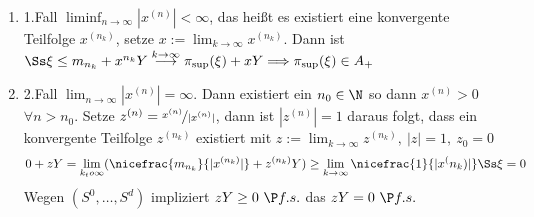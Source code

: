 \begin{bew}[Lemma 2.4]
\begin{enumerate}
 	 		\begin{enumerate}
 	 			\item 1.Fall $\operatorname{liminf}_{n\to\infty}|x^{(n)}|<\infty$, das heißt es existiert eine konvergente Teilfolge $x^{(n_k)}$, setze $x:=\lim_{k\to\infty}x^{(n_k)}$. Dann ist $\Ss\xi\le m_{n_k}+x^{n_k}Y\overset{k\to\infty}{\longrightarrow}\pi_{\sup}(\xi)+xY\Longrightarrow \pi_{\sup}(\xi)\in A_+$
 	 			\item 2.Fall $\lim_{n\to\infty}|x^{(n)}|=\infty$. Dann existiert ein $n_0\in\N$ so dann $x^{(n)}>0 $ $\forall n>n_0$. Setze $z^{(n)}=\nicefrac{x^{(n)}}{|x^{(n)}|}$, dann ist $|z^{(n)}|=1$ daraus folgt, dass ein konvergente Teilfolge $z^{(n_k)}$ existiert mit $z:=\lim_{k\to\infty}z^{(n_k)},\ |z|=1,\ z_0=0$
 	 			\begin{align*}
 	 				0+zY=\lim_{k_to\infty}(\nicefrac{m_{n_k}}{|x^{(n_k)}|}+z^{(n_k)}Y)\ge\lim_{k\to\infty}\nicefrac{1}{|x^(n_k)|}\Ss\xi=0
 	 			\end{align*}
 	 			Wegen $(S^0,…,S^d)$ \af impliziert $zY\ge 0\ \P f.s.$ das $zY=0\ \P f.s.$
 	 		\end{enumerate}
 	 		 	 	\end{enumerate}
 	 \end{bew}